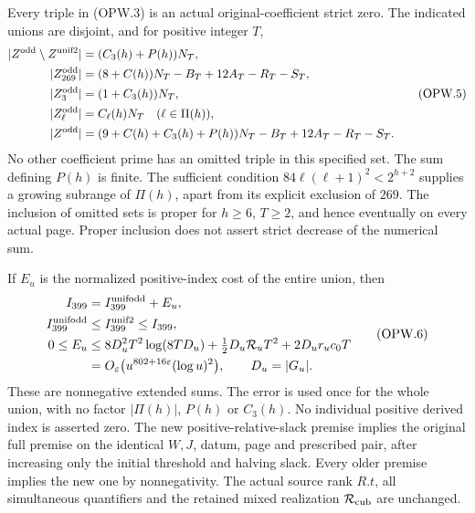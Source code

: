 \begin{theorem}
\label{AC-G176-window}
Every triple in (OPW.3) is an actual original-coefficient strict zero.
The indicated unions are disjoint, and for positive integer $T$,
\[
 \begin{aligned}
 |Z^{\rm odd}\setminus Z^{\rm unif2}|&=(C_3(h)+P(h))N_T,\\
 |Z^{\rm odd}_{269}|&=(8+C(h))N_T-B_T+12A_T-R_T-S_T,\\
 |Z^{\rm odd}_{3}|&=(1+C_3(h))N_T,\\
 |Z^{\rm odd}_{\ell}|&=C_\ell(h)N_T\quad(\ell\in\Pi(h)),\\
 |Z^{\rm odd}|&=(9+C(h)+C_3(h)+P(h))N_T
                                     -B_T+12A_T-R_T-S_T.
 \end{aligned}
 \tag{OPW.5}
\]
No other coefficient prime has an omitted triple in this specified set.
The sum defining $P(h)$ is finite.  The sufficient condition
$84\ell(\ell+1)^2<2^{h+2}$ supplies a growing subrange of $\Pi(h)$,
apart from its explicit exclusion of $269$.
The inclusion of omitted sets is proper for $h\geq6$, $T\geq2$,
and hence eventually on every actual page.
Proper inclusion does not assert strict decrease of the numerical sum.

If $E_u$ is the normalized positive-index cost of the entire union, then
\[
 \begin{aligned}
 I_{399}&=I_{399}^{\rm unifodd}+E_u,\\
 I_{399}^{\rm unifodd}&\leq I_{399}^{\rm unif2}\leq I_{399},\\
 0\leq E_u&\leq8D_u^2T^2\log(8TD_u)
                  +\tfrac12D_u\mathcal R_uT^2+2D_ur_uc_0T\\
 &=O_\varepsilon\bigl(u^{802+16\varepsilon}(\log u)^2\bigr),
                         \qquad D_u=|G_u|.
 \end{aligned}
 \tag{OPW.6}
\]
These are nonnegative extended sums.  The error is used once for the
whole union, with no factor $|\Pi(h)|$, $P(h)$ or $C_3(h)$.
No individual positive derived index is asserted zero.
The new positive-relative-slack premise implies the original full
premise on the identical $W,J$, datum, page and prescribed pair,
after increasing only the initial threshold and halving slack.
Every older premise implies the new one by nonnegativity.
The actual source rank $R.t$, all simultaneous quantifiers and
the retained mixed realization $\mathcal R_{\rm cub}$ are unchanged.
\end{theorem}

